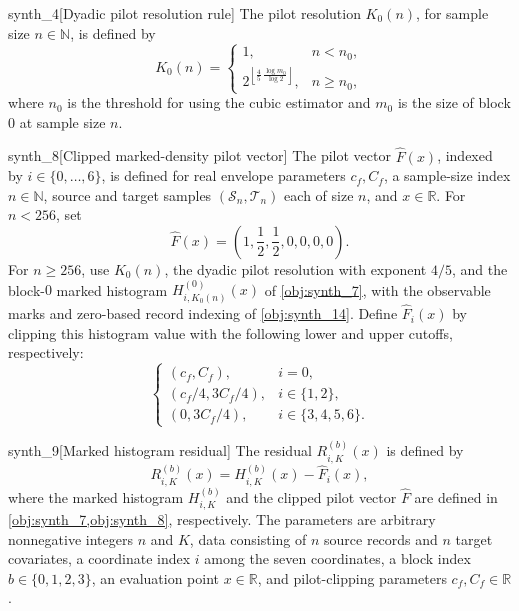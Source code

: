 \documentclass[11pt]{article}
\begin{document}
\begin{definitionv}{synth_4}[Dyadic pilot resolution rule]
The pilot resolution \(K_0(n)\), for sample size \(n\in\mathbb N\), is defined by
\[
K_0(n)=
\begin{cases}
1, & n<n_0,\\[2pt]
2^{\left\lfloor \frac45\,\frac{\log m_0}{\log 2}\right\rfloor},
& n\ge n_0,
\end{cases}
\]
where \(n_0\) is the threshold for using the cubic estimator and \(m_0\) is the size of block \(0\) at sample size \(n\).
\end{definitionv}

\begin{definitionv}{synth_8}[Clipped marked-density pilot vector]
The pilot vector \(\widehat F(x)\), indexed by \(i\in\{0,\ldots,6\}\), is defined for real envelope parameters \(c_f,C_f\), a sample-size index \(n\in\mathbb N\), source and target samples \((\mathcal S_n,\mathcal T_n)\) each of size \(n\), and \(x\in\mathbb R\). For \(n<256\), set
\[
\widehat F(x)=\left(1,\frac12,\frac12,0,0,0,0\right).
\]
For \(n\ge256\), use \(K_0(n)\), the dyadic pilot resolution with exponent \(4/5\), and the block-\(0\) marked histogram \(H_{i,K_0(n)}^{(0)}(x)\) of \cref{obj:synth_7}, with the observable marks and zero-based record indexing of \cref{obj:synth_14}. Define \(\widehat F_i(x)\) by clipping this histogram value with the following lower and upper cutoffs, respectively:
\[
\begin{cases}
(c_f,C_f), & i=0,\\
(c_f/4,3C_f/4), & i\in\{1,2\},\\
(0,3C_f/4), & i\in\{3,4,5,6\}.
\end{cases}
\]
\end{definitionv}

\begin{definitionv}{synth_9}[Marked histogram residual]
The residual \(R_{i,K}^{(b)}(x)\) is defined by
\[
R_{i,K}^{(b)}(x)
=
H_{i,K}^{(b)}(x)-\widehat F_i(x),
\]
where the marked histogram \(H_{i,K}^{(b)}\) and the clipped pilot vector \(\widehat F\) are defined in \cref{obj:synth_7,obj:synth_8}, respectively. The parameters are arbitrary nonnegative integers \(n\) and \(K\), data consisting of \(n\) source records and \(n\) target covariates, a coordinate index \(i\) among the seven coordinates, a block index \(b\in\{0,1,2,3\}\), an evaluation point \(x\in\mathbb R\), and pilot-clipping parameters \(c_f,C_f\in\mathbb R\).
\end{definitionv}
\end{document}
